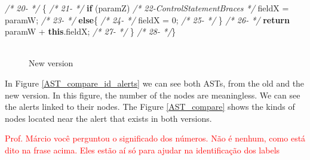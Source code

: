 \documentclass[
]{article}
\newenvironment{Shaded}{\begin{snugshade}}{\end{snugshade}}
\newcommand{\CommentTok}[1]{\textcolor[rgb]{0.56,0.35,0.01}{\textit{#1}}}
\newcommand{\DecValTok}[1]{\textcolor[rgb]{0.00,0.00,0.81}{#1}}
\newcommand{\FunctionTok}[1]{\textcolor[rgb]{0.00,0.00,0.00}{#1}}
\newcommand{\KeywordTok}[1]{\textcolor[rgb]{0.13,0.29,0.53}{\textbf{#1}}}
\newcommand{\NormalTok}[1]{#1}
\begin{document}
\begin{Shaded}
\begin{Highlighting}[]
\CommentTok{/* 20-                                   */}\NormalTok{    \{}
\CommentTok{/* 21-                                   */}        \KeywordTok{if}\NormalTok{ (paramZ)}
\CommentTok{/* 22-ControlStatementBraces             */}\NormalTok{            fieldX = paramW;}
\CommentTok{/* 23-                                   */}        \KeywordTok{else}\NormalTok{\{}
\CommentTok{/* 24-                                   */}\NormalTok{            fieldX = }\DecValTok{0}\NormalTok{;}
\CommentTok{/* 25-                                   */}\NormalTok{     \}}
\CommentTok{/* 26-                                   */}        \KeywordTok{return}\NormalTok{ paramW + }\KeywordTok{this}\NormalTok{.}\FunctionTok{fieldX}\NormalTok{;}
\CommentTok{/* 27-                                   */}\NormalTok{     \}}
\CommentTok{/* 28-                                   */}\NormalTok{\}  }
\end{Highlighting}
\end{Shaded}

\normalsize

\begin{figure}
\centering
\includegraphics{figures/fake.png}
\caption{New version \label{new_simple_code}}
\end{figure}

In Figure \ref{AST_compare_id_alerts} we can see both ASTs, from the old
and the new version. In this figure, the number of the nodes are
meaningless. We can see the alerts linked to their nodes. The Figure
\ref{AST_compare} shows the kinds of nodes located near the alert that
exists in both versions.

\textcolor{red}{Prof. Márcio você perguntou o significado dos números. Não é nenhum, como está dito na frase acima. Eles estão aí só para ajudar na identificação dos labels}

\small
\end{document}
